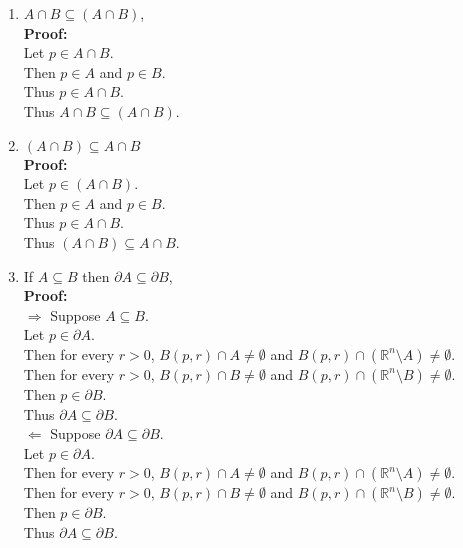 \documentclass{article}
\begin{document}
\begin{enumerate}
\begin{enumerate}
    \item  $A \cap B \subseteq (A \cap B)$, \\
    
\textbf{Proof:} \\
Let $p \in A \cap B$. \\
Then $p \in A$ and $p \in B$. \\
Thus $p \in A \cap B$. \\
Thus $A \cap B \subseteq (A \cap B)$.\\

    
    \item $(A \cap B) \subseteq A \cap B$\\
    
\textbf{Proof:} \\
Let $p \in (A \cap B)$. \\
Then $p \in A$ and $p \in B$. \\
Thus $p \in A \cap B$. \\
Thus $(A \cap B) \subseteq A \cap B$.\\

    
    \item If $A \subseteq B$ then $\partial A \subseteq \partial B$,\\
    
\textbf{Proof:} \\
$\Rightarrow$ Suppose $A \subseteq B$. \\
Let $p \in \partial A$. \\
Then for every $r > 0$, $B(p,r) \cap A \neq \emptyset$ and $B(p,r) \cap (\mathbb{R}^n \setminus A) \neq \emptyset$. \\
Then for every $r > 0$, $B(p,r) \cap B \neq \emptyset$ and $B(p,r) \cap (\mathbb{R}^n \setminus B) \neq \emptyset$. \\
Then $p \in \partial B$. \\
Thus $\partial A \subseteq \partial B$.\\
$\Leftarrow$ Suppose $\partial A \subseteq \partial B$. \\
Let $p \in \partial A$. \\
Then for every $r > 0$, $B(p,r) \cap A \neq \emptyset$ and $B(p,r) \cap (\mathbb{R}^n \setminus A) \neq \emptyset$. \\
Then for every $r > 0$, $B(p,r) \cap B \neq \emptyset$ and $B(p,r) \cap (\mathbb{R}^n \setminus B) \neq \emptyset$. \\
Then $p \in \partial B$. \\
Thus $\partial A \subseteq \partial B$.\\


\end{enumerate}
\end{enumerate}
\end{document}
